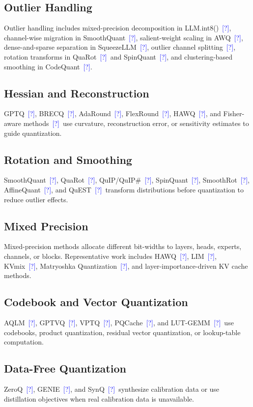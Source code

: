 \documentclass[journal,10pt]{IEEEtran}
\newcommand{\CITE}{\textcolor{blue}{[?]}}
\begin{document}
\subsection{Outlier Handling}
Outlier handling includes mixed-precision decomposition in LLM.int8()~\CITE, channel-wise migration in SmoothQuant~\CITE, salient-weight scaling in AWQ~\CITE, dense-and-sparse separation in SqueezeLLM~\CITE, outlier channel splitting~\CITE, rotation transforms in QuaRot~\CITE\ and SpinQuant~\CITE, and clustering-based smoothing in CodeQuant~\CITE.

\subsection{Hessian and Reconstruction}
GPTQ~\CITE, BRECQ~\CITE, AdaRound~\CITE, FlexRound~\CITE, HAWQ~\CITE, and Fisher-aware methods~\CITE\ use curvature, reconstruction error, or sensitivity estimates to guide quantization.

\subsection{Rotation and Smoothing}
SmoothQuant~\CITE, QuaRot~\CITE, QuIP/QuIP\#~\CITE, SpinQuant~\CITE, SmoothRot~\CITE, AffineQuant~\CITE, and QuEST~\CITE\ transform distributions before quantization to reduce outlier effects.

\subsection{Mixed Precision}
Mixed-precision methods allocate different bit-widths to layers, heads, experts, channels, or blocks. Representative work includes HAWQ~\CITE, LIM~\CITE, KVmix~\CITE, Matryoshka Quantization~\CITE, and layer-importance-driven KV cache methods.

\subsection{Codebook and Vector Quantization}
AQLM~\CITE, GPTVQ~\CITE, VPTQ~\CITE, PQCache~\CITE, and LUT-GEMM~\CITE\ use codebooks, product quantization, residual vector quantization, or lookup-table computation.

\subsection{Data-Free Quantization}
ZeroQ~\CITE, GENIE~\CITE, and SynQ~\CITE\ synthesize calibration data or use distillation objectives when real calibration data is unavailable.
\end{document}
